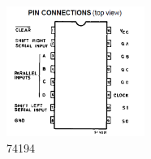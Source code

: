 \documentclass{ctexart}
\begin{document}
\begin{figure}[H]
    \centering
    \begin{minipage}{0.5\textwidth}
    \includegraphics[width=0.4\textwidth]{74194.png}
           \caption{74194}
    \label{}
    \end{minipage}
    \hspace{0.05\textwidth}
    \begin{minipage}{0.3\textwidth}
    
    \end{minipage}
\end{figure}
\end{document}
